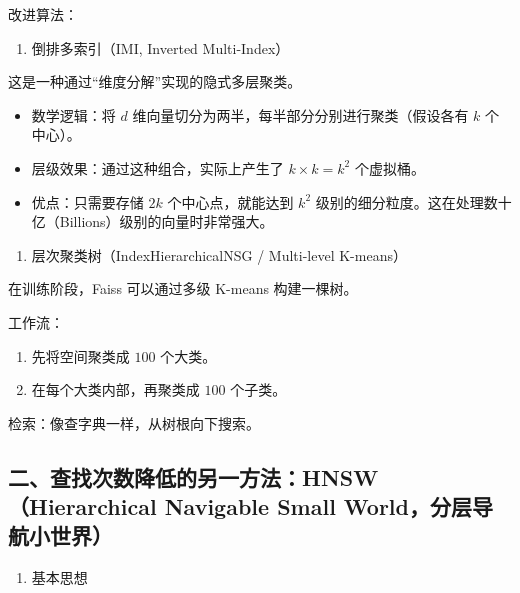改进算法：

\begin{enumerate}
\def\labelenumi{\arabic{enumi}.}
\tightlist
\item
  倒排多索引（IMI, Inverted Multi-Index）
\end{enumerate}

这是一种通过``维度分解''实现的隐式多层聚类。

\begin{itemize}
\tightlist
\item
  数学逻辑：将 \(d\) 维向量切分为两半，每半部分分别进行聚类（假设各有 \(k\) 个中心）。
\item
  层级效果：通过这种组合，实际上产生了 \(k\times k=k^2\) 个虚拟桶。
\item
  优点：只需要存储 \(2k\) 个中心点，就能达到 \(k^2\) 级别的细分粒度。这在处理数十亿（Billions）级别的向量时非常强大。
\end{itemize}

\begin{enumerate}
\def\labelenumi{\arabic{enumi}.}
\setcounter{enumi}{1}
\tightlist
\item
  层次聚类树（IndexHierarchicalNSG / Multi-level K-means）
\end{enumerate}

在训练阶段，Faiss 可以通过多级 K-means 构建一棵树。

工作流：

\begin{enumerate}
\def\labelenumi{\arabic{enumi}.}
\item
  先将空间聚类成 \(100\) 个大类。
\item
  在每个大类内部，再聚类成 \(100\) 个子类。
\end{enumerate}

检索：像查字典一样，从树根向下搜索。

\hypertarget{ux4e8cux67e5ux627eux6b21ux6570ux964dux4f4eux7684ux53e6ux4e00ux65b9ux6cd5hnswhierarchical-navigable-small-worldux5206ux5c42ux5bfcux822aux5c0fux4e16ux754c}{%
\subsection{二、查找次数降低的另一方法：HNSW（Hierarchical Navigable Small World，分层导航小世界）}\label{ux4e8cux67e5ux627eux6b21ux6570ux964dux4f4eux7684ux53e6ux4e00ux65b9ux6cd5hnswhierarchical-navigable-small-worldux5206ux5c42ux5bfcux822aux5c0fux4e16ux754c}}

\begin{enumerate}
\def\labelenumi{\arabic{enumi}.}
\tightlist
\item
  基本思想
\end{enumerate}

